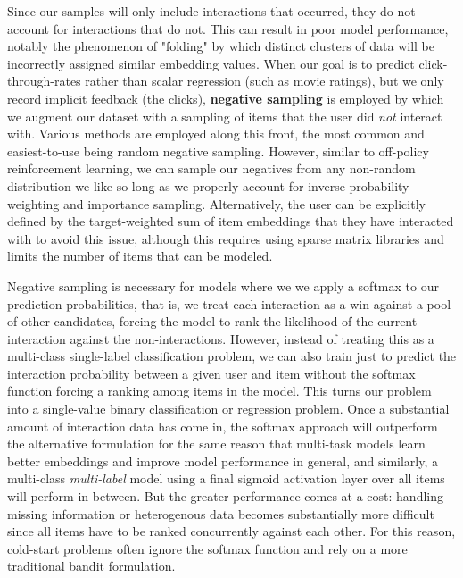 \documentclass[manuscript, nonacm, screen=true]{acmart}
\begin{document}
Since our samples will only include interactions that occurred, they do not account for interactions that do not. This can result in poor model performance, notably the phenomenon of "folding" by which distinct clusters of data will be incorrectly assigned similar embedding values\cite{folding_without_negative_sampling_recsys}. When our goal is to predict click-through-rates rather than scalar regression (such as movie ratings), but we only record implicit feedback (the clicks), \textbf{negative sampling} is employed by which we augment our dataset with a sampling of items that the user did \textit{not} interact with.  Various methods are employed along this front, the most common and easiest-to-use being random negative sampling. However, similar to off-policy reinforcement learning, we can sample our negatives from any non-random distribution we like so long as we properly account for inverse probability weighting and importance sampling\cite{bengio_negative_sampling}. Alternatively, the user can be explicitly defined by the target-weighted sum of item embeddings that they have interacted with to avoid this issue, although this requires using sparse matrix libraries and limits the number of items that can be modeled.

Negative sampling is necessary for models where we we apply a softmax to our prediction probabilities, that is, we treat each interaction as a win against a pool of other candidates, forcing the model to rank the likelihood of the current interaction against the non-interactions. However, instead of treating this as a  multi-class single-label classification problem, we can also train just to predict the interaction probability between a given user and item without the softmax function forcing a ranking among items in the model. This turns our problem into a single-value binary classification or regression problem. Once a substantial amount of interaction data has come in, the softmax approach will outperform the alternative formulation for the same reason that multi-task models learn better embeddings and improve model performance in general, and similarly, a multi-class \textit{multi-label} model using a final sigmoid activation layer over all items will perform in between. But the greater performance comes at a cost: handling missing information or heterogenous data becomes substantially more difficult since all items have to be ranked concurrently against each other. For this reason, cold-start problems often ignore the softmax function and rely on a more traditional bandit formulation.
\end{document}
